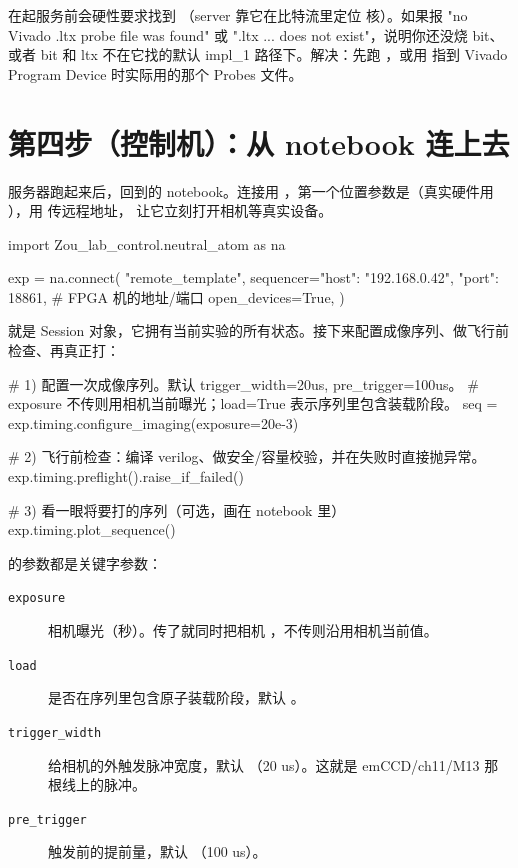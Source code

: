 \documentclass[11pt,oneside,openany]{book}
\begin{document}
\begin{notebox}
 在起服务前会硬性要求找到 （server 靠它在比特流里定位  核）。如果报 "no Vivado .ltx probe file was found" 或 ".ltx ... does not exist"，说明你还没烧 bit、或者 bit 和 ltx 不在它找的默认 impl\_1 路径下。解决：先跑 ，或用  指到 Vivado Program Device 时实际用的那个 Probes 文件。
\end{notebox}

\section{第四步（控制机）：从 notebook 连上去}

服务器跑起来后，回到的 notebook。连接用 ，第一个位置参数是（真实硬件用 ），用  传远程地址， 让它立刻打开相机等真实设备。

\begin{codeblock}[Python]
import Zou_lab_control.neutral_atom as na

exp = na.connect(
    "remote_template",
    sequencer={"host": "192.168.0.42", "port": 18861},  # FPGA 机的地址/端口
    open_devices=True,
)
\end{codeblock}

 就是 Session 对象，它拥有当前实验的所有状态。接下来配置成像序列、做飞行前检查、再真正打：

\begin{codeblock}[Python]
# 1) 配置一次成像序列。默认 trigger_width=20us, pre_trigger=100us。
#    exposure 不传则用相机当前曝光；load=True 表示序列里包含装载阶段。
seq = exp.timing.configure_imaging(exposure=20e-3)

# 2) 飞行前检查：编译 verilog、做安全/容量校验，并在失败时直接抛异常。
exp.timing.preflight().raise_if_failed()

# 3) 看一眼将要打的序列（可选，画在 notebook 里）
exp.timing.plot_sequence()
\end{codeblock}

 的参数都是关键字参数：

\begin{description}
\item[\texttt{exposure}] 相机曝光（秒）。传了就同时把相机 ，不传则沿用相机当前值。
\item[\texttt{load}] 是否在序列里包含原子装载阶段，默认 。
\item[\texttt{trigger\_width}] 给相机的外触发脉冲宽度，默认 （20 us）。这就是 emCCD/ch11/M13 那根线上的脉冲。
\item[\texttt{pre\_trigger}] 触发前的提前量，默认 （100 us）。
\end{description}
\end{document}
